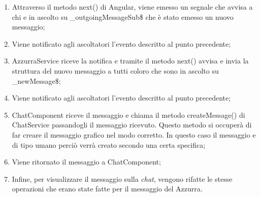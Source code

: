 \begin{enumerate}
	\item Attraverso il metodo next() di Angular, viene emesso un segnale che avvisa a chi e in ascolto su \_outgoingMessageSub\$ che è stato emesso un nuovo messaggio;
	\item Viene notificato agli ascoltatori l'evento descritto al punto precedente;
	\item AzzurraService riceve la notifica e tramite il metodo next() avvisa e invia la struttura del nuovo messaggio a tutti coloro che sono in ascolto su \_newMessage\$;
	\item Viene notificato agli ascoltatori l'evento descritto al punto precedente;
	\item ChatComponent riceve il messaggio e chiama il metodo createMessage() di ChatService passandogli il messaggio ricevuto. Questo metodo si occuperà di far creare il messaggio grafico nel modo corretto. In questo caso il messaggio e di tipo umano perciò verrà creato secondo una certa specifica;
	\item Viene ritornato il messaggio a ChatComponent;
	\item Infine, per visualizzare il messaggio sulla \emph{chat}, vengono rifatte le stesse operazioni che erano state fatte per il messaggio del  Azzurra.
\end{enumerate}

